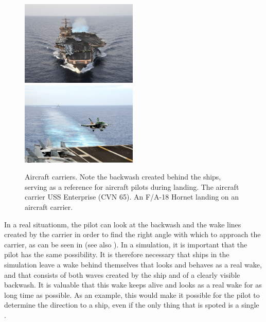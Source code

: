 \begin{figure}
    \centering
    \subcaptionbox{\label{fig:aircraft_carrier_full_wake}} {\includegraphics[width=0.495\textwidth]{Images/Public_domain/The_aircraft_carrier_USS_Enterprise_(CVN_65)}}
    \subcaptionbox{\label{fig:aircraft_carrier_landing_backwash}} {\includegraphics[width=0.495\textwidth]{Images/Public_domain/An_F-A-18C_Hornet_lands_on_the_aircraft_carrier_USS_George_Washington_(CVN_73)}}
    \caption{Aircraft carriers. Note the backwash created behind the ships, serving as a reference for aircraft pilots during landing.  The aircraft carrier USS Enterprise (CVN 65).  An F/A-18 Hornet landing on an aircraft carrier.}
    \label{fig:aircraft_carriers_and_backwash}
\end{figure}

In a real situationm, the pilot can look at the backwash and the wake lines created by the carrier in order to find the right angle with which to approach the carrier, as can be seen in \citep{Alivewithpassion2007,MatteoBram2007} (see also ). In a simulation, it is important that the pilot has the same possibility. It is therefore necessary that ships in the simulation leave a wake behind themselves that looks and behaves as a real wake, and that consists of both waves created by the ship and of a clearly visible backwash. It is valuable that this wake keeps alive and looks as a real wake for as long time as possible. As an example, this would make it possible for the pilot to determine the direction to a ship, even if the only thing that is spoted is a single .